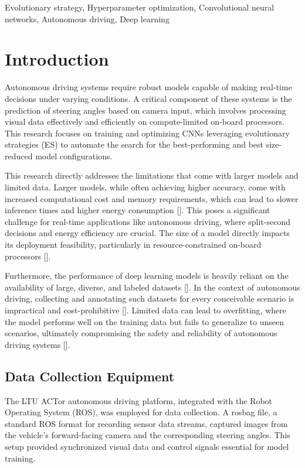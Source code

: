 \documentclass[conference]{IEEEtran}
\begin{document}
\begin{IEEEkeywords}
Evolutionary strategy, Hyperparameter optimization, Convolutional neural networks, Autonomous driving, Deep learning
\end{IEEEkeywords}

\section{Introduction}
Autonomous driving systems require robust models capable of making real-time decisions under varying conditions. A critical component of these systems is the prediction of steering angles based on camera input, which involves processing visual data effectively and efficiently on compute-limited on-board processors. This research focuses on training and optimizing CNNs leveraging evolutionary strategies (ES) to automate the search for the best-performing and best size-reduced model configurations.

This research directly addresses the limitations that come with larger models and limited data. Larger models, while often achieving higher accuracy, come with increased computational cost and memory requirements, which can lead to slower inference times and higher energy consumption []. This poses a significant challenge for real-time applications like autonomous driving, where split-second decisions and energy efficiency are crucial. The size of a model directly impacts its deployment feasibility, particularly in resource-constrained on-board processors [].

Furthermore, the performance of deep learning models is heavily reliant on the availability of large, diverse, and labeled datasets []. In the context of autonomous driving, collecting and annotating such datasets for every conceivable scenario is impractical and cost-prohibitive []. Limited data can lead to overfitting, where the model performs well on the training data but fails to generalize to unseen scenarios, ultimately compromising the safety and reliability of autonomous driving systems [].

\subsection{Data Collection Equipment}
The LTU ACTor autonomous driving platform, integrated with the Robot Operating System (ROS), was employed for data collection. A rosbag file, a standard ROS format for recording sensor data streams, captured images from the vehicle’s forward-facing camera and the corresponding steering angles. This setup provided synchronized visual data and control signals essential for model training.
\end{document}
